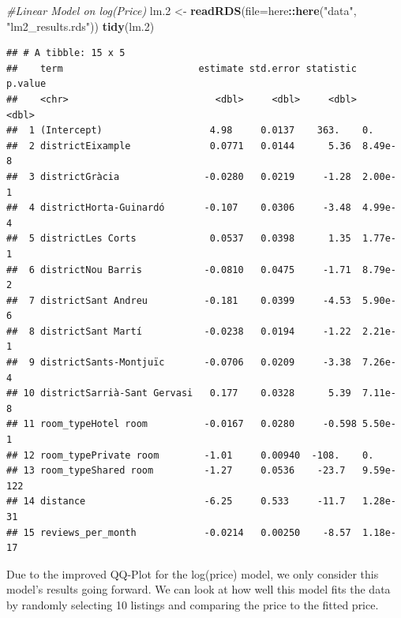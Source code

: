 \documentclass[]{article}
\newenvironment{Shaded}{\begin{snugshade}}{\end{snugshade}}
\newcommand{\CommentTok}[1]{\textcolor[rgb]{0.56,0.35,0.01}{\textit{#1}}}
\newcommand{\DataTypeTok}[1]{\textcolor[rgb]{0.13,0.29,0.53}{#1}}
\newcommand{\FloatTok}[1]{\textcolor[rgb]{0.00,0.00,0.81}{#1}}
\newcommand{\KeywordTok}[1]{\textcolor[rgb]{0.13,0.29,0.53}{\textbf{#1}}}
\newcommand{\NormalTok}[1]{#1}
\newcommand{\OperatorTok}[1]{\textcolor[rgb]{0.81,0.36,0.00}{\textbf{#1}}}
\newcommand{\StringTok}[1]{\textcolor[rgb]{0.31,0.60,0.02}{#1}}
\begin{document}
\begin{Shaded}
\begin{Highlighting}[]
\CommentTok{#Linear Model on log(Price)}
\NormalTok{lm}\FloatTok{.2}\NormalTok{ <-}\StringTok{ }\KeywordTok{readRDS}\NormalTok{(}\DataTypeTok{file=}\NormalTok{here}\OperatorTok{::}\KeywordTok{here}\NormalTok{(}\StringTok{"data"}\NormalTok{, }\StringTok{"lm2_results.rds"}\NormalTok{))}
\KeywordTok{tidy}\NormalTok{(lm}\FloatTok{.2}\NormalTok{)}
\end{Highlighting}
\end{Shaded}

\begin{verbatim}
## # A tibble: 15 x 5
##    term                        estimate std.error statistic   p.value
##    <chr>                          <dbl>     <dbl>     <dbl>     <dbl>
##  1 (Intercept)                   4.98     0.0137    363.    0.       
##  2 districtEixample              0.0771   0.0144      5.36  8.49e-  8
##  3 districtGràcia               -0.0280   0.0219     -1.28  2.00e-  1
##  4 districtHorta-Guinardó       -0.107    0.0306     -3.48  4.99e-  4
##  5 districtLes Corts             0.0537   0.0398      1.35  1.77e-  1
##  6 districtNou Barris           -0.0810   0.0475     -1.71  8.79e-  2
##  7 districtSant Andreu          -0.181    0.0399     -4.53  5.90e-  6
##  8 districtSant Martí           -0.0238   0.0194     -1.22  2.21e-  1
##  9 districtSants-Montjuïc       -0.0706   0.0209     -3.38  7.26e-  4
## 10 districtSarrià-Sant Gervasi   0.177    0.0328      5.39  7.11e-  8
## 11 room_typeHotel room          -0.0167   0.0280     -0.598 5.50e-  1
## 12 room_typePrivate room        -1.01     0.00940  -108.    0.       
## 13 room_typeShared room         -1.27     0.0536    -23.7   9.59e-122
## 14 distance                     -6.25     0.533     -11.7   1.28e- 31
## 15 reviews_per_month            -0.0214   0.00250    -8.57  1.18e- 17
\end{verbatim}

Due to the improved QQ-Plot for the log(price) model, we only consider
this model's results going forward. We can look at how well this model
fits the data by randomly selecting 10 listings and comparing the price
to the fitted price.
\end{document}
